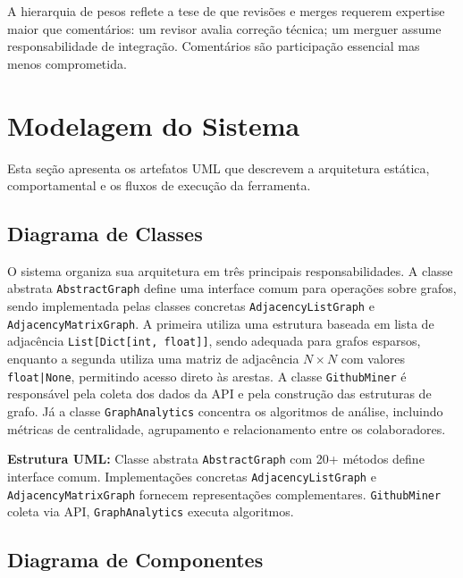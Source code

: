 \documentclass[12pt,a4paper]{article}
\begin{document}
A hierarquia de pesos reflete a tese de que revisões e merges requerem expertise maior que comentários: um revisor avalia correção técnica; um merguer assume responsabilidade de integração. Comentários são participação essencial mas menos comprometida.

\section{Modelagem do Sistema}\label{sec:modelagem_sistema}

Esta seção apresenta os artefatos UML que descrevem a arquitetura estática, comportamental e os fluxos de execução da ferramenta.

\subsection{Diagrama de Classes}

O sistema organiza sua arquitetura em três principais responsabilidades. A classe abstrata \texttt{AbstractGraph} define uma interface comum para operações sobre grafos, sendo implementada pelas classes concretas \texttt{AdjacencyListGraph} e \texttt{AdjacencyMatrixGraph}. A primeira utiliza uma estrutura baseada em lista de adjacência \texttt{List[Dict[int, float]]}, sendo adequada para grafos esparsos, enquanto a segunda utiliza uma matriz de adjacência $N \times N$ com valores \texttt{float|None}, permitindo acesso direto às arestas. A classe \texttt{GithubMiner} é responsável pela coleta dos dados da API e pela construção das estruturas de grafo. Já a classe \texttt{GraphAnalytics} concentra os algoritmos de análise, incluindo métricas de centralidade, agrupamento e relacionamento entre os colaboradores.

\textbf{Estrutura UML:} Classe abstrata \texttt{AbstractGraph} com 20+ métodos define interface comum. Implementações concretas \texttt{AdjacencyListGraph} e \texttt{AdjacencyMatrixGraph} fornecem representações complementares. \texttt{GithubMiner} coleta via API, \texttt{GraphAnalytics} executa algoritmos.

\subsection{Diagrama de Componentes}
\end{document}
